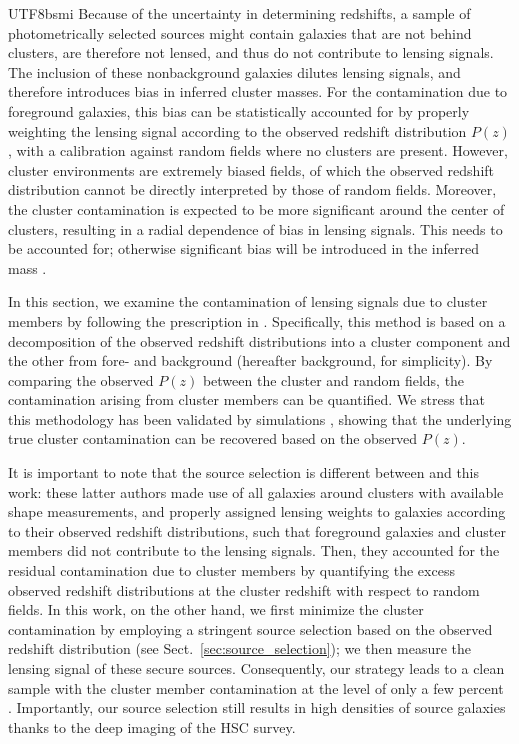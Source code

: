 \documentclass[longauth]{aa}
\newcommand{\redshift}{\ensuremath{z}}
\begin{document}
\begin{CJK*}{UTF8}{bsmi}
Because of the uncertainty in determining redshifts, a sample of photometrically selected sources might contain galaxies that are not behind clusters, are therefore not lensed, and thus do not contribute to lensing signals.
The inclusion of these nonbackground galaxies dilutes lensing signals, and therefore introduces bias in inferred cluster masses.
For the contamination due to foreground galaxies, this bias can be statistically accounted for by properly weighting the lensing signal according to the observed redshift distribution $P\left(\redshift\right)$, with a calibration against random fields where no clusters are present.
However, cluster environments are extremely biased fields, of which the observed redshift distribution cannot be directly interpreted by those of random fields.
Moreover, the cluster contamination is expected to be more significant around the center of clusters, resulting in a radial dependence of bias in lensing signals.
This needs to be accounted for; otherwise significant bias will be introduced in the inferred mass \citep{medezinski18a}.

In this section, we examine the contamination of lensing signals due to cluster members by following the prescription in \cite{mcclintock19} \citep[see also][]{gruen14,melchior17,varga19,chiu20}.
Specifically, this method is based on a decomposition of the observed redshift distributions into a cluster component and the other from fore- and background (hereafter background, for simplicity).
By comparing the observed $P\left(\redshift\right)$ between the cluster and random fields, the contamination arising from cluster members can be quantified.
We stress that this methodology has been validated by simulations \citep{varga19}, showing that the underlying true cluster contamination can be recovered based on the observed $P\left(\redshift\right)$.

It is important to note that the source selection is different between \cite{mcclintock19} and this work:
these latter authors made use of all galaxies around clusters with available shape measurements, and properly assigned lensing weights to galaxies according to their observed redshift distributions, such that foreground galaxies and cluster members did not contribute to the lensing signals.
Then, they accounted for the residual contamination due to cluster members by quantifying the excess observed redshift distributions at the cluster redshift with respect to random fields.
In this work, on the other hand, we first minimize the cluster contamination by employing a stringent source selection based on the observed redshift distribution (see Sect.~\ref{sec:source_selection}); we then measure the lensing signal of these secure sources.
Consequently, our strategy leads to a clean sample with the cluster member contamination at the level of only a few percent \citep{medezinski18a,umetsu20}.
Importantly, our source selection still results in high densities of source galaxies thanks to the deep imaging of the HSC survey.


\end{CJK*}
\end{document}
